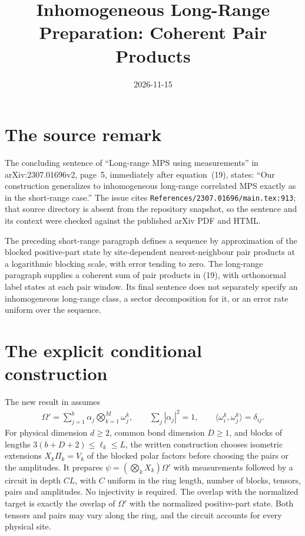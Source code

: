 \documentclass{article}
\title{Inhomogeneous Long-Range Preparation: Coherent Pair Products}
\author{}
\date{2026-11-15}
\begin{document}
\maketitle
{}

\section{The source remark}
The concluding sentence of ``Long-range MPS using measurements'' in
arXiv:2307.01696v2, page~5, immediately after equation~(19), states:
``Our construction generalizes to inhomogeneous long-range correlated MPS
exactly as in the short-range case.'' The issue cites
\texttt{References/2307.01696/main.tex:913}; that source directory is absent
from the repository snapshot, so the sentence and its context were checked
against the published arXiv PDF and HTML.

The preceding short-range paragraph defines a sequence by approximation of
the blocked positive-part state by site-dependent nearest-neighbour pair
products at a logarithmic blocking scale, with error tending to zero. The
long-range paragraph supplies a coherent sum of pair products in (19),
with orthonormal label states at each pair window. Its final sentence does
not separately specify an inhomogeneous long-range class, a sector
decomposition for it, or an error rate uniform over the sequence.

\section{The explicit conditional construction}
The new result in
 assumes
\begin{align*}
    \Omega'=\sum_{j=1}^b\alpha_j\bigotimes_{k=1}^M\omega_j^k,
    \qquad \sum_j|\alpha_j|^2=1,
    \qquad \langle\omega_i^k,\omega_j^k\rangle=\delta_{ij}.
\end{align*}
For physical dimension $d\ge2$, common bond dimension $D\ge1$, and blocks
of lengths $3(b+D+2)\le\ell_k\le L$, the written construction chooses
isometric extensions $X_k\Pi_k=V_k$ of the blocked polar factors before
choosing the pairs or the amplitudes. It prepares
$\psi=(\bigotimes_kX_k)\Omega'$ with measurements followed by a circuit
in depth $CL$, with $C$ uniform in the ring length, number of blocks,
tensors, pairs and amplitudes. No injectivity is required. The overlap
with the normalized target is exactly the overlap of $\Omega'$ with the
normalized positive-part state. Both tensors and pairs may vary along
the ring, and the circuit accounts for every physical site.
\end{document}
